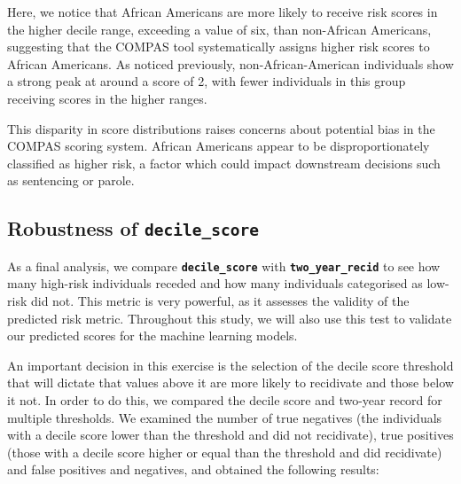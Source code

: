 Here, we notice that African Americans are more likely to receive risk scores in the higher decile range, exceeding a value of six, than non-African Americans, suggesting that the COMPAS tool systematically assigns higher risk scores to African Americans. As noticed previously, non-African-American individuals show a strong peak at around a score of 2, with fewer individuals in this group receiving scores in the higher ranges.

This disparity in score distributions raises concerns about potential bias in the COMPAS scoring system. African Americans appear to be disproportionately classified as higher risk, a factor which could impact downstream decisions such as sentencing or parole.

\subsection{Robustness of \textbf{\texttt{decile\_score}}}

As a final analysis, we compare \textbf{\texttt{decile\_score}} with \textbf{\texttt{two\_year\_recid}} to see how many high-risk individuals receded and how many individuals categorised as low-risk did not. This metric is very powerful, as it assesses the validity of the predicted risk metric. Throughout this study, we will also use this test to validate our predicted scores for the machine learning models.


An important decision in this exercise is the selection of the decile score threshold that will dictate that values above it are more likely to recidivate and those below it not. In order to do this, we compared the decile score and two-year record for multiple thresholds. We examined the number of true negatives (the individuals with a decile score lower than the threshold and did not recidivate), true positives (those with a decile score higher or equal than the threshold and did recidivate) and false positives and negatives, and obtained the following results:

